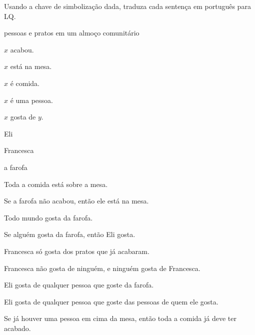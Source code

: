 \problempart
Usando a chave de simbolização dada, traduza cada sentença em português para LQ.
\begin{ekey}
\item[UD:] pessoas e pratos em um almoço comunitário
\item[Rx:] $x$ acabou.
\item[Tx:] $x$ está na mesa.
\item[Fx:] $x$ é comida.
\item[Px:] $x$ é uma pessoa.
\item[Lxy:] $x$ gosta de $y$.
\item[e:] Eli
\item[f:] Francesca
\item[g:] a farofa
\end{ekey}
\begin{earg}
\item Toda a comida está sobre a mesa.
\item Se a farofa não acabou, então ele está na mesa.
\item Todo mundo gosta da farofa.
\item Se alguém gosta da farofa, então Eli gosta.
\item Francesca só gosta dos pratos que já acabaram.
\item Francesca não gosta de ninguém, e ninguém gosta de Francesca.
\item Eli gosta de qualquer pessoa que goste da farofa.
\item Eli gosta de qualquer pessoa que goste das pessoas de quem ele gosta.
\item Se já houver uma pessoa em cima da mesa, então toda a comida já deve ter acabado.
\end{earg}


